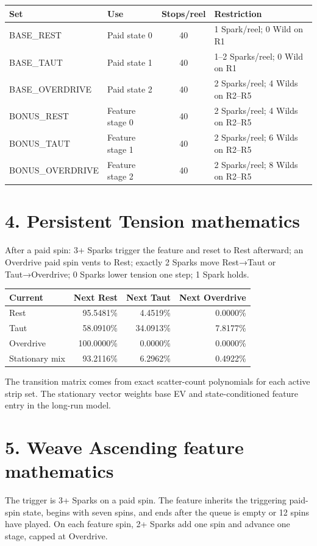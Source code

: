 \documentclass[10pt]{article}
\newcommand{\sectionbar}[1]{\vspace{8pt}{\color{acid}\rule{\linewidth}{1.5pt}}\vspace{-5pt}\section*{#1}}
\begin{document}
\begin{center}\begin{tabular}{l l c l}
\hline Set & Use & Stops/reel & Restriction\\\hline
BASE\_REST & Paid state 0 & 40 & 1 Spark/reel; 0 Wild on R1\\
BASE\_TAUT & Paid state 1 & 40 & 1--2 Sparks/reel; 0 Wild on R1\\
BASE\_OVERDRIVE & Paid state 2 & 40 & 2 Sparks/reel; 4 Wilds on R2--R5\\
BONUS\_REST & Feature stage 0 & 40 & 2 Sparks/reel; 4 Wilds on R2--R5\\
BONUS\_TAUT & Feature stage 1 & 40 & 2 Sparks/reel; 6 Wilds on R2--R5\\
BONUS\_OVERDRIVE & Feature stage 2 & 40 & 2 Sparks/reel; 8 Wilds on R2--R5\\\hline
\end{tabular}\end{center}

\sectionbar{4. Persistent Tension mathematics}
After a paid spin: 3+ Sparks trigger the feature and reset to Rest afterward; an Overdrive paid spin vents to Rest; exactly 2 Sparks move Rest→Taut or Taut→Overdrive; 0 Sparks lower tension one step; 1 Spark holds.

\begin{center}\begin{tabular}{l r r r}
\hline Current & Next Rest & Next Taut & Next Overdrive\\\hline
Rest & 95.5481\% & 4.4519\% & 0.0000\%\\
Taut & 58.0910\% & 34.0913\% & 7.8177\%\\
Overdrive & 100.0000\% & 0.0000\% & 0.0000\%\\\hline
Stationary mix & 93.2116\% & 6.2962\% & 0.4922\%\\\hline
\end{tabular}\end{center}

The transition matrix comes from exact scatter-count polynomials for each active strip set. The stationary vector weights base EV and state-conditioned feature entry in the long-run model.

\sectionbar{5. Weave Ascending feature mathematics}
The trigger is 3+ Sparks on a paid spin. The feature inherits the triggering paid-spin state, begins with seven spins, and ends after the queue is empty or 12 spins have played. On each feature spin, 2+ Sparks add one spin and advance one stage, capped at Overdrive.
\end{document}
